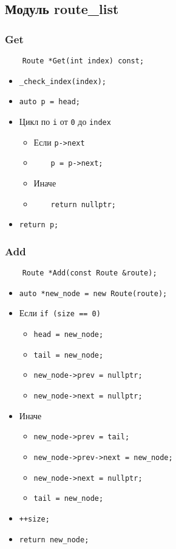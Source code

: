 \subsection{Модуль route\_list}

\subsubsection{Get}

\begin{lstlisting}
    Route *Get(int index) const;
\end{lstlisting}

\begin{itemize}
    \item \verb|_check_index(index);|
    \item \verb|auto p = head;|
    \item Цикл по \verb|i| от \verb|0| до \verb|index|
        \begin{itemize}
            \item Если \verb|p->next|
            \item \ \ \ \ \verb|p = p->next;|
            \item Иначе
            \item \ \ \ \ \verb|return nullptr;|
        \end{itemize}
    \item \verb|return p;|
\end{itemize}

\subsubsection{Add}

\begin{lstlisting}
    Route *Add(const Route &route);
\end{lstlisting}

\begin{itemize}
    \item \verb|auto *new_node = new Route(route);|
    \item Если \verb|if (size == 0)|
    \begin{itemize}
        \item \verb|head = new_node;|
        \item \verb|tail = new_node;|
        \item \verb|new_node->prev = nullptr;|
        \item \verb|new_node->next = nullptr;|
    \end{itemize}
    \item Иначе
    \begin{itemize}
        \item \verb|new_node->prev = tail;|
        \item \verb|new_node->prev->next = new_node;|
        \item \verb|new_node->next = nullptr;|
        \item \verb|tail = new_node;|
    \end{itemize}
    \item \verb|++size;|
    \item \verb|return new_node;|
\end{itemize}

